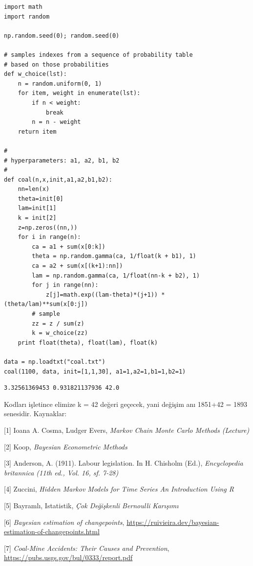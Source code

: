 \documentclass[12pt,fleqn]{article}\usepackage{../../common}
\begin{document}
\begin{verbatim}
import math
import random

np.random.seed(0); random.seed(0)

# samples indexes from a sequence of probability table
# based on those probabilities
def w_choice(lst):
    n = random.uniform(0, 1)
    for item, weight in enumerate(lst):
        if n < weight:
            break
        n = n - weight
    return item

#
# hyperparameters: a1, a2, b1, b2
#
def coal(n,x,init,a1,a2,b1,b2):
    nn=len(x)
    theta=init[0]
    lam=init[1]
    k = init[2]
    z=np.zeros((nn,))
    for i in range(n):
        ca = a1 + sum(x[0:k])
        theta = np.random.gamma(ca, 1/float(k + b1), 1) 
        ca = a2 + sum(x[(k+1):nn])
        lam = np.random.gamma(ca, 1/float(nn-k + b2), 1)
        for j in range(nn):
            z[j]=math.exp((lam-theta)*(j+1)) * (theta/lam)**sum(x[0:j])
        # sample
        zz = z / sum(z)
        k = w_choice(zz)
    print float(theta), float(lam), float(k)
                
data = np.loadtxt("coal.txt")
coal(1100, data, init=[1,1,30], a1=1,a2=1,b1=1,b2=1)
\end{verbatim}

\begin{verbatim}
3.32561369453 0.931821137936 42.0
\end{verbatim}

Kodları işletince elimize k = 42 değeri geçecek, yani değişim anı 1851+42 = 1893
senesidir. 
Kaynaklar: 

[1] Ioana A. Cosma, Ludger Evers, {\em Markov Chain Monte Carlo Methods (Lecture)}

[2] Koop, {\em Bayesian Econometric Methods}

[3] Anderson, A. (1911). Labour legislation. In H. Chisholm (Ed.),
{\em Encyclopedia britannica (11th ed., Vol. 16, sf. 7-28)}

[4] Zuccini, {\em Hidden Markov Models for Time Series An Introduction Using R}

[5] Bayramlı, Istatistik, {\em Çok Değişkenli Bernoulli Karışımı}

[6] {\em Bayesian estimation of changepoints},
    \url{https://ruivieira.dev/bayesian-estimation-of-changepoints.html}

[7] {\em Coal-Mine Accidents: Their Causes and Prevention},
    \url{https://pubs.usgs.gov/bul/0333/report.pdf}
    
\end{document}
